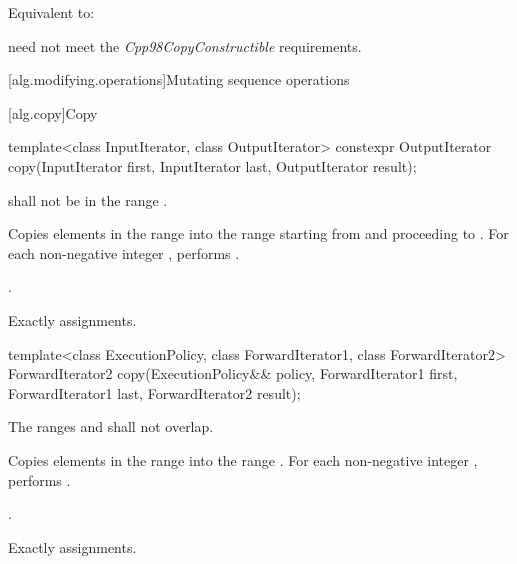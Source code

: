\begin{itemdescr}
\pnum
\effects
Equivalent to: 

\pnum
\remarks
{} need not meet the \textit{Cpp98CopyConstructible} requirements.
\end{itemdescr}

[alg.modifying.operations]{Mutating sequence operations}

[alg.copy]{Copy}

%
\begin{itemdecl}
template<class InputIterator, class OutputIterator>
  constexpr OutputIterator copy(InputIterator first, InputIterator last,
                                OutputIterator result);
\end{itemdecl}

\begin{itemdescr}
\pnum
\requires {} shall not be in the range .

\pnum
\effects Copies elements in the range  into the range  starting from  and proceeding to . For each non-negative integer , performs .

\pnum
\returns {}.

\pnum
\complexity Exactly  assignments.
\end{itemdescr}

%
\begin{itemdecl}
template<class ExecutionPolicy, class ForwardIterator1, class ForwardIterator2>
  ForwardIterator2 copy(ExecutionPolicy&& policy,
                        ForwardIterator1 first, ForwardIterator1 last,
                        ForwardIterator2 result);
\end{itemdecl}

\begin{itemdescr}
\pnum
\requires The ranges  and
 shall not overlap.

\pnum
\effects Copies elements in the range  into
the range .
For each non-negative integer ,
performs .

\pnum
\returns {}.

\pnum
\complexity Exactly  assignments.
\end{itemdescr}

